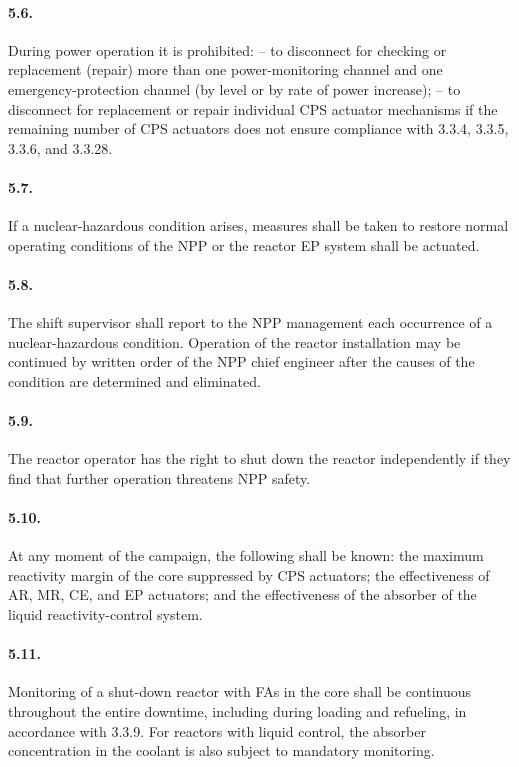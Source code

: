 \documentclass[openright]{bookest}
\begin{document}
\paragraph{5.6.} During power operation it is prohibited:
-- to disconnect for checking or replacement (repair) more than one power-monitoring channel and one emergency-protection channel (by level or by rate of power increase);
-- to disconnect for replacement or repair individual CPS actuator mechanisms if the remaining number of CPS actuators does not ensure compliance with 3.3.4, 3.3.5, 3.3.6, and 3.3.28.

\paragraph{5.7.} If a nuclear-hazardous condition arises, measures shall be taken to restore normal operating conditions of the NPP or the reactor EP system shall be actuated.

\paragraph{5.8.} The shift supervisor shall report to the NPP management each occurrence of a nuclear-hazardous condition. Operation of the reactor installation may be continued by written order of the NPP chief engineer after the causes of the condition are determined and eliminated.

\paragraph{5.9.} The reactor operator has the right to shut down the reactor independently if they find that further operation threatens NPP safety.

\paragraph{5.10.} At any moment of the campaign, the following shall be known: the maximum reactivity margin of the core suppressed by CPS actuators; the effectiveness of AR, MR, CE, and EP actuators; and the effectiveness of the absorber of the liquid reactivity-control system.

\paragraph{5.11.} Monitoring of a shut-down reactor with FAs in the core shall be continuous throughout the entire downtime, including during loading and refueling, in accordance with 3.3.9. For reactors with liquid control, the absorber concentration in the coolant is also subject to mandatory monitoring.
\end{document}
